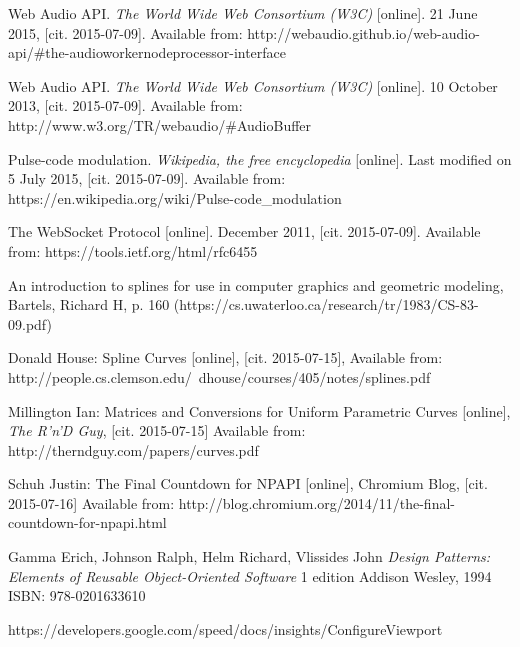 \begin{thebibliography}{99}
Web Audio API. \emph{The World Wide Web Consortium (W3C)} [online]. 21 June 2015, [cit. 2015-07-09]. Available from: http://webaudio.github.io/web-audio-api/\#the-audioworkernodeprocessor-interface	

Web Audio API. \emph{The World Wide Web Consortium (W3C)} [online]. 10 October 2013, [cit. 2015-07-09]. Available from: http://www.w3.org/TR/webaudio/\#AudioBuffer

Pulse-code modulation. \emph{Wikipedia, the free encyclopedia} [online]. Last modified on 5 July 2015, [cit. 2015-07-09]. Available from: https://en.wikipedia.org/wiki/Pulse-code\_modulation

The WebSocket Protocol [online]. December 2011, [cit. 2015-07-09]. Available from: https://tools.ietf.org/html/rfc6455


An introduction to splines for use in computer graphics and geometric modeling, Bartels, Richard H, p. 160
(https://cs.uwaterloo.ca/research/tr/1983/CS-83-09.pdf)

{\sc Donald} House: Spline Curves [online], [cit. 2015-07-15], Available from: http://people.cs.clemson.edu/~dhouse/courses/405/notes/splines.pdf

{\sc Millington} Ian: Matrices and Conversions for Uniform Parametric Curves [online], \emph{The R'n'D Guy}, [cit. 2015-07-15] Available from: http://therndguy.com/papers/curves.pdf

{\sc Schuh} Justin: The Final Countdown for NPAPI [online], Chromium Blog, [cit. 2015-07-16] Available from: http://blog.chromium.org/2014/11/the-final-countdown-for-npapi.html

{\sc Gamma} Erich, {\sc Johnson} Ralph, {\sc Helm} Richard, {\sc Vlissides} John
\emph{Design Patterns: Elements of Reusable Object-Oriented Software}
1 edition
Addison Wesley, 1994
ISBN: 978-0201633610




https://developers.google.com/speed/docs/insights/ConfigureViewport

\end{thebibliography}
